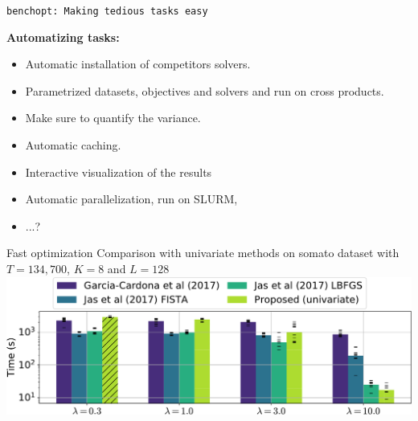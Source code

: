 \documentclass{beamer}
\begin{document}
\begin{frame}{\texttt{benchopt: Making tedious tasks easy}}

    {\bf Automatizing tasks:}\\[1.2em]
    \begin{itemize}\itemsep.7em
        \item Automatic installation of competitors solvers.
        \item Parametrized datasets, objectives and solvers and run on cross products.
        \item Make sure to quantify the variance.
        \item Automatic caching.
        \item Interactive visualization of the results
        \item Automatic parallelization, run on SLURM,
        \item ...?
    \end{itemize}
\end{frame}





\appendix


\begin{frame}{Fast optimization}
Comparison with univariate methods on somato dataset with $T=134,700$, $K=8$ and $L=128$\\[1em]
\includegraphics[width=\textwidth]{all_last_0001_T_13470_P1_K8_L128}
\end{frame}
\end{document}

